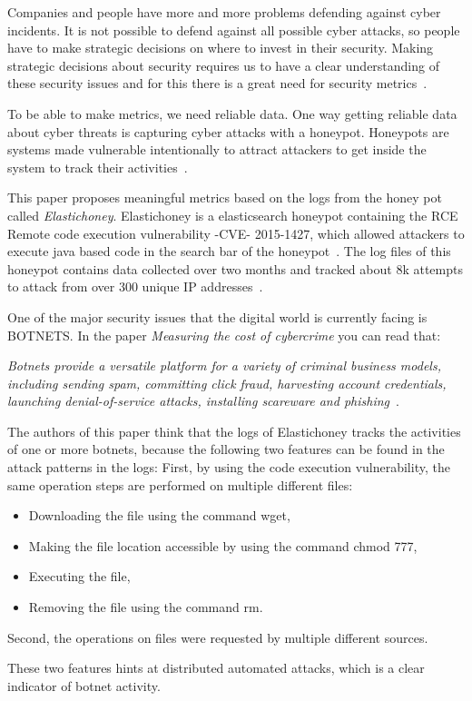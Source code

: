 \label{cap:sec1}
Companies and people have more and more problems defending against cyber incidents. It is not possible to defend against all possible cyber attacks, so people have to make strategic decisions on where to invest in their security. Making strategic decisions about security requires us to have a clear understanding of these security issues and for this there is a great need for security metrics~\cite{BR2010}.

To be able to make metrics, we need reliable data. One way getting reliable data about cyber threats is capturing cyber attacks with a honeypot. Honeypots are systems made vulnerable intentionally to attract attackers to get inside the system to track their activities~\cite{WP2010}.

This paper proposes meaningful metrics based on the logs from the honey pot called \textit{Elastichoney}. Elastichoney is a elasticsearch honeypot containing the RCE Remote code execution vulnerability -CVE- 2015-1427, which allowed attackers to execute java based code in the search bar of the honeypot~\cite{CVE}. The log files of this honeypot contains data collected over two months and tracked about 8k attempts to attack from over 300 unique IP addresses~\cite{BR2010}.

One of the major security issues that the digital world is currently facing is BOTNETS. In the paper \textit{Measuring the cost of cybercrime} you can read that:

\textit{Botnets provide a versatile platform for a variety of criminal business models, including sending spam, committing click fraud, harvesting account credentials, launching denial-of-service attacks, installing scareware and phishing}~\cite{AR2013}.

The authors of this paper think that the logs of Elastichoney tracks the activities of one or more botnets, because the following two features can be found in the attack patterns in the logs:
First, by using the code execution vulnerability, the same operation steps are performed on multiple different files:
\begin{itemize}
\item Downloading the file using the command wget,
\item Making the file location accessible by using the command chmod 777,
\item Executing the file,
\item Removing the file using the command rm.
\end{itemize}
Second, the operations on files were requested by multiple different sources.

These two features hints at distributed automated attacks, which is a clear indicator of botnet activity.

